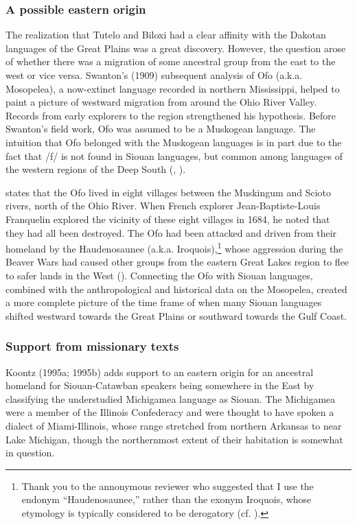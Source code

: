 \documentclass[output=paper]{LSP/langsci}
\begin{document}
\subsubsection{A possible eastern origin} The realization that Tutelo and Biloxi had a clear affinity with the Dakotan languages of the Great Plains was a great discovery. However, the question arose of whether there was a migration of some ancestral group from the east to the west or vice versa. Swanton's (1909) subsequent analysis of Ofo (a.k.a. Mosopelea), a now-extinct language recorded in northern Mississippi, helped to paint a picture of westward migration from around the Ohio River Valley. Records from early explorers to the region strengthened his hypothesis. Before Swanton's field work, Ofo was assumed to be a Muskogean language. The intuition that Ofo belonged with the Muskogean languages is in part due to the fact that /f/ is not found in Siouan languages, but common among languages of the western regions of the Deep South (\citealt{Rankin2004}, \citealt{Kaufman2014}). 

\citet{Hanna1911} states that the Ofo lived in eight villages between the Muskingum and Scioto rivers, north of the Ohio River. When French explorer Jean-Baptiste-Louis Franquelin explored the vicinity of these eight villages in 1684, he noted that they had all been destroyed. The Ofo had been attacked and driven from their homeland by the Haudenosaunee (a.k.a. Iroquois),\footnote{Thank you to the annonymous reviewer who suggested that I use the endonym ``Haudenosaunee,'' rather than the exonym Iroquois, whose etymology is typically considered to be derogatory (cf. \citealt{Day1968}).} whose aggression during the Beaver Wars had caused other groups from the eastern Great Lakes region to flee to safer lands in the West (\citealt{Swanton1952}). Connecting the Ofo with Siouan languages, combined with the anthropological and historical data on the Mosopelea, created a more complete picture of the time frame of when many Siouan languages shifted westward towards the Great Plains or southward towards the Gulf Coast. 

\subsubsection{Support from missionary texts} Koontz (1995a; 1995b) adds support to an eastern origin for an ancestral homeland for Siouan-Catawban speakers being somewhere in the East by classifying the understudied Michigamea language  as Siouan. The Michigamea were a member of the Illinois Confederacy and were thought to have spoken a dialect of Miami-Illinois, whose range stretched from northern Arkansas to near Lake Michigan, though the northernmost extent of their habitation is somewhat in question. 
\end{document}
